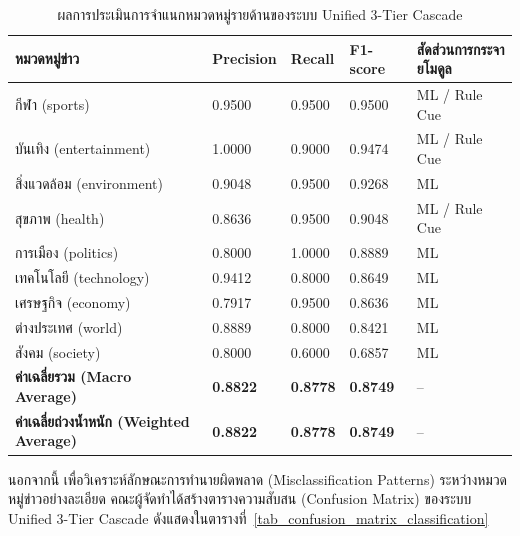 \begin{table}[H]
\centering
\caption{ผลการประเมินการจำแนกหมวดหมู่รายด้านของระบบ Unified 3-Tier Cascade}
\label{tab_classification_per_category}
\small
\renewcommand{\arraystretch}{1.0}
\begin{tabularx}{\textwidth}{|Y|C{1.8cm}|C{1.8cm}|C{1.8cm}|C{3.8cm}|}
\hline
\textbf{หมวดหมู่ข่าว} & \textbf{Precision} & \textbf{Recall} & \textbf{F1-score} & \textbf{สัดส่วนการกระจายโมดูล} \\
\hline
กีฬา (sports) & 0.9500 & 0.9500 & 0.9500 & ML / Rule Cue \\ \hline
บันเทิง (entertainment) & 1.0000 & 0.9000 & 0.9474 & ML / Rule Cue \\ \hline
สิ่งแวดล้อม (environment) & 0.9048 & 0.9500 & 0.9268 & ML \\ \hline
สุขภาพ (health) & 0.8636 & 0.9500 & 0.9048 & ML / Rule Cue \\ \hline
การเมือง (politics) & 0.8000 & 1.0000 & 0.8889 & ML \\ \hline
เทคโนโลยี (technology) & 0.9412 & 0.8000 & 0.8649 & ML \\ \hline
เศรษฐกิจ (economy) & 0.7917 & 0.9500 & 0.8636 & ML \\ \hline
ต่างประเทศ (world) & 0.8889 & 0.8000 & 0.8421 & ML \\ \hline
สังคม (society) & 0.8000 & 0.6000 & 0.6857 & ML \\
\hline
\textbf{ค่าเฉลี่ยรวม (Macro Average)} & \textbf{0.8822} & \textbf{0.8778} & \textbf{0.8749} & -- \\ \hline
\textbf{ค่าเฉลี่ยถ่วงน้ำหนัก (Weighted Average)} & \textbf{0.8822} & \textbf{0.8778} & \textbf{0.8749} & -- \\
\hline
\end{tabularx}
\end{table}

นอกจากนี้ เพื่อวิเคราะห์ลักษณะการทำนายผิดพลาด (Misclassification Patterns) ระหว่างหมวดหมู่ข่าวอย่างละเอียด คณะผู้จัดทำได้สร้างตารางความสับสน (Confusion Matrix) ของระบบ Unified 3-Tier Cascade ดังแสดงในตารางที่~\ref{tab_confusion_matrix_classification}

